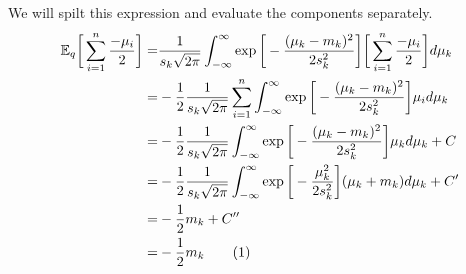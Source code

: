 \documentclass[]{article}
\newcommand{\Expectation} {\mathbb{E}}
\newcommand\numberthis    {\addtocounter{equation}{1}\tag{\theequation}}
\begin{document}
We will spilt this expression and evaluate the components separately.
\begin{align*}
	\Expectation_q\bigg[\sum_{i=1}^{n} \frac{-\mu_i}{2}\bigg]=& 	\frac{1}{s_k\sqrt{2\pi}} \int_{-\infty}^{\infty} \exp{\bigg[-\frac{(\mu_k-m_k)^2}{2 s_k^2}\bigg]}\bigg[\sum_{i=1}^{n} \frac{-\mu_i}{2}\bigg] d \mu_k\\
	=& 	-\frac{1}{2}\frac{1}{s_k\sqrt{2\pi}} \sum_{i=1}^{n} \int_{-\infty}^{\infty} \exp{\bigg[-\frac{(\mu_k-m_k)^2}{2 s_k^2}\bigg]} \mu_i d \mu_k\\
	=& 	-\frac{1}{2} \frac{1}{s_k\sqrt{2\pi}} \int_{-\infty}^{\infty} \exp{\bigg[-\frac{(\mu_k-m_k)^2}{2 s_k^2}\bigg]}\mu_k d \mu_k + C\\
	=& -\frac{1}{2}	\frac{1}{s_k\sqrt{2\pi}} \int_{-\infty}^{\infty} \exp{\bigg[-\frac{\mu_k^2}{2 s_k^2}\bigg]}(\mu_k+m_k) d \mu_k + C^\prime\\
	=&-\frac{1}{2} m_k + C^{\prime\prime}\\
	=& -\frac{1}{2} m_k \numberthis \label{eq:ELBO:31}
\end{align*}
\end{document}
